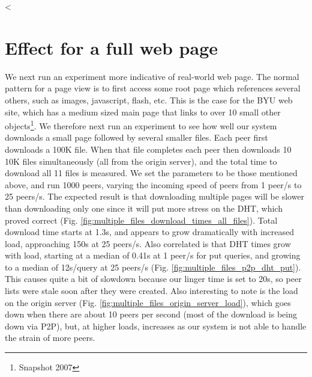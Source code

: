 

<%

\section{Effect for a full web page}

We next run an experiment more indicative of real-world web page. The normal pattern for a page view 
is to first access some root page which references several others, such as images, 
javascript, flash, etc. This is the case for the BYU web site, which has a medium sized main page that 
links to over 10 small other objects\footnote{Snapshot 2007}. We therefore next run an experiment 
to see how well our system downloads a small page followed by several smaller files. Each peer first 
downloads a 100K file. When that file completes each peer then downloads 10 10K files simultaneously 
(all from the origin server), and the total time to download all 11 files is measured. We set the parameters 
to be those mentioned above, and run 1000 peers, varying the incoming speed of peers from 1 peer/s to 25 
peers/s. 
The expected result is that downloading multiple pages will be slower than downloading only one 
since it will put more stress on the DHT, which proved correct (Fig. \ref{fig:multiple_files_download_times_all_files}). 
Total download time starts at 1.3s, and appears to grow dramatically with increased load, approaching 
150s at 25 peers/s. Also correlated is that DHT times grow with load, starting 
at a median of 0.41s at 1 peer/s for put queries, and growing to a median of 12s/query at 25 peers/s 
(Fig. \ref{fig:multiple_files_p2p_dht_put}). This causes quite a bit of slowdown because our
linger time is set to 20s, so peer lists were stale soon after they were created.  Also interesting to note is 
the load on the origin server (Fig. \ref{fig:multiple_files_origin_server_load}), which goes down when there are 
about 10 peers per second (most of the download is being down via P2P), but, at higher loads, increases as our 
system is not able to handle the strain of more peers. 


